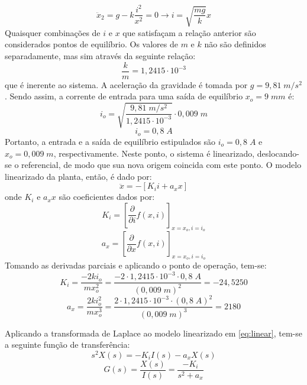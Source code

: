 \documentclass{ifacconf}
\begin{document}
\begin{equation}
    \ddot{x}_2 = g - k \frac{i^2}{x^2} = 0 \rightarrow i = \sqrt{\frac{mg}{k}}x
\end{equation}
Quaisquer combinações de $i$ e $x$ que satisfaçam a relação anterior são considerados pontos de equilíbrio. Os valores de $m$ e $k$ não são definidos separadamente, mas sim através da seguinte relação:
\begin{equation}
    \frac{k}{m} = 1,2415 \cdot 10^{-3}
\end{equation}
\noindent que é inerente ao sistema. A aceleração da gravidade é tomada por $g = 9,81 \; m/s^2$. Sendo assim, a corrente de entrada para uma saída de equilíbrio $x_o = 9\;mm$ é:
\begin{equation}
    i_o = \sqrt{\frac{9,81\;m/s^2}{1,2415 \cdot 10^{-3}}} \cdot 0,009\;m
\end{equation}
\begin{equation}
    i_o = 0,8\;A
\end{equation}
Portanto, a entrada e a saída de equilíbrio estipulados são $i_o = 0,8\;A$ e $x_o = 0,009\;m$, respectivamente. Neste ponto, o sistema é linearizado, deslocando-se o referencial, de modo que sua nova origem coincida com este ponto. O modelo linearizado da planta, então, é dado por:
\begin{equation}
    \ddot{x} = -[K_i i + a_x x]
    \label{eq:linear}
\end{equation}
onde $K_i$ e $a_x x$ são coeficientes dados por:
\begin{equation}
    K_i = [\frac{\partial}{\partial i}f(x,i)]_{x = x_o, i = i_o}
\end{equation}
\begin{equation}
    a_x = [\frac{\partial}{\partial x}f(x,i)]_{x = x_o, i = i_o}
\end{equation}
Tomando as derivadas parciais e aplicando o ponto de operação, tem-se:
\begin{equation}
    K_i = \frac{-2ki_o}{mx_o^2} = \frac{-2\cdot1,2415 \cdot 10^{-3}\cdot 0,8\;A}{(0,009\;m)^2} = -24,5250
\end{equation}
\begin{equation}
    a_x = \frac{2ki_o^2}{mx_o^3} = \frac{2\cdot1,2415 \cdot 10^{-3}\cdot (0,8\;A)^2}{(0,009\;m)^3} = 2180
\end{equation}

Aplicando a transformada de Laplace ao modelo linearizado em \ref{eq:linear}, tem-se a seguinte função de transferência:
\begin{equation}
    s^2X(s) = -K_i I(s) - a_x X(s)
\end{equation}
\begin{equation}
    G(s) = \frac{X(s)}{I(s)} = \frac{-K_i}{s^2+a_x}
    \label{eq:FT1}
\end{equation}
\end{document}

